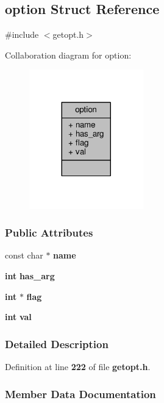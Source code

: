 \subsection{option Struct Reference}
\label{structoption}


{\ttfamily \#include $<$getopt.\+h$>$}



Collaboration diagram for option\+:
\nopagebreak
\begin{figure}[H]
\begin{center}
\leavevmode
\includegraphics[width=140pt]{d5/d16/structoption__coll__graph}
\end{center}
\end{figure}
\subsubsection*{Public Attributes}
\begin{DoxyCompactItemize}
\item 
const char $\ast$ {\bf name}
\item 
{\bf int} {\bf has\+\_\+arg}
\item 
{\bf int} $\ast$ {\bf flag}
\item 
{\bf int} {\bf val}
\end{DoxyCompactItemize}


\subsubsection{Detailed Description}


Definition at line {\bf 222} of file {\bf getopt.\+h}.



\subsubsection{Member Data Documentation}
